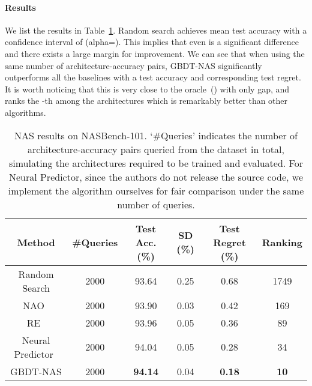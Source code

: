 \documentclass{article}
\begin{document}
\paragraph{Results} We list the results in Table~\ref{tbl:nasbench}. Random search achieves  mean test accuracy with a confidence interval of  (alpha=). This implies that even  is a significant difference and there exists a large margin for improvement. We can see that when using the same number of architecture-accuracy pairs, GBDT-NAS significantly outperforms all the baselines with a  test accuracy and corresponding  test regret. It is worth noticing that this is very close to the oracle~() with only  gap, and ranks the -th among the  architectures which is remarkably better than other algorithms.
\begin{table}
\small
\caption{NAS results on NASBench-101. `\#Queries' indicates the number of architecture-accuracy pairs queried from the dataset in total, simulating the architectures required to be trained and evaluated. For Neural Predictor, since the authors do not release the source code, we implement the algorithm ourselves for fair comparison under the same number of queries.}
\label{tbl:nasbench}
\centering
\begin{tabular}{cccccc}
\toprule
Method              & \#Queries & Test Acc. (\%) & SD (\%) & Test Regret (\%) & Ranking \\
\midrule
Random Search       & 2000      & 93.64    & 0.25         & 0.68      & 1749\\
NAO~\cite{nao}     & 2000      & 93.90    & 0.03         & 0.42      & 169\\
RE~\cite{amoebanet}& 2000      & 93.96    & 0.05         & 0.36      & 89\\
Neural Predictor~\cite{neuralpredictor} & 2000 & 94.04  & 0.05 & 0.28 & 34\\
\midrule
GBDT-NAS         & 2000      &\textbf{94.14}   & 0.04   & \textbf{0.18} & \textbf{10}\\
\bottomrule
\end{tabular}
\end{table}
\end{document}
